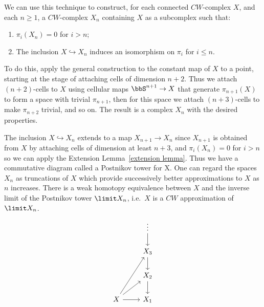 \begin{example}
    We can use this technique to construct, for each connected $CW$-complex $X$, and each $n\geq 1$, a $CW$-complex $X_n$ containing $X$ as a subcomplex such that:
    \begin{enumerate}[label=(\alph*)]
        \item $\pi_i(X_n)=0$ for $i>n$;
        \item The inclusion $X\hookrightarrow X_n$ induces an isomorphism on $\pi_i$ for $i\leq n$.
    \end{enumerate}
    To do this, apply the general construction to the constant map of $X$ to a point, starting at the stage of attaching cells of dimension $n+2$. Thus we attach $(n+2)$-cells to $X$ using cellular maps $\bbS^{n+1}\to X$ that generate $\pi_{n+1}(X)$ to form a space with trivial $\pi_{n+1}$, then for this space we attach $(n+3)$-cells to make $\pi_{n+2}$ trivial, and so on. The result is a complex $X_n$ with the desired properties.

    The inclusion $X\hookrightarrow X_n$ extends to a map $X_{n+1}\to X_n$ since $X_{n+1}$ is obtained from $X$ by attaching cells of dimension at least $n+3$, and $\pi_i(X_n)=0$ for $i>n$ so we can apply the Extension Lemma~\ref{extension lemma}. Thus we have a commutative diagram called a Postnikov tower for X. One can regard the spaces $X_n$ as truncations of $X$ which provide successively better approximations to $X$ as $n$ increases. There is a weak homotopy equivalence between $X$ and the inverse limit of the Postnikov tower $\limit X_n$, i.e.~$X$ is a $CW$ approximation of $\limit X_n$.
    \[
    \begin{tikzcd}[every matrix/.append style={name=m}]
       & \vdots \arrow[d]\\
       & X_3 \arrow[d]\\
       & X_2 \arrow[d]\\
       X\arrow[r]\arrow[ur]\arrow[uur] & X_1
    \end{tikzcd}
    \]
\end{example}


